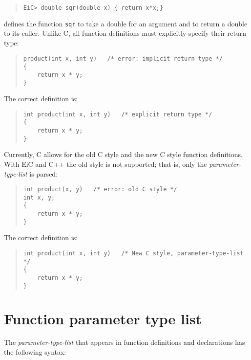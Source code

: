 \begin{quote}
        {\tt EiC> double sqr(double x) \{ return x*x;\} }       
\end{quote}
defines the function {\tt sqr} to take a double for an argument and to
return a double to its caller.  Unlike  C, all
function definitions must explicitly specify their return type:
\begin{quote}
\begin{verbatim}
product(int x, int y)   /* error: implicit return type */
{
    return x * y;
} 
\end{verbatim}
\end{quote}
 The correct definition is:
\begin{quote}
\begin{verbatim}
int product(int x, int y)   /* explicit return type */
{
    return x * y;
} 
\end{verbatim}
\end{quote}
 Currently,  C allows for the old C style and the new C style
function definitions. With EiC and C++ the old style is not
supported; that is, only the {\it parameter-type-list} is parsed:
\begin{quote}
\begin{verbatim}
int product(x, y)   /* error: old C style */
int x, y;
{
    return x * y;
} 
\end{verbatim}
\end{quote}
 The correct definition is:
\begin{quote}
\begin{verbatim}
int product(int x, int y)   /* New C style, parameter-type-list */
{
    return x * y;
} 
\end{verbatim}
\end{quote}


\section{Function parameter type list}
\label{sec:FunctionParameterList}
The {\it parameter-type-list} that appears in function definitions and
declarations has the following syntax:

\begin{production}
\end{production}


